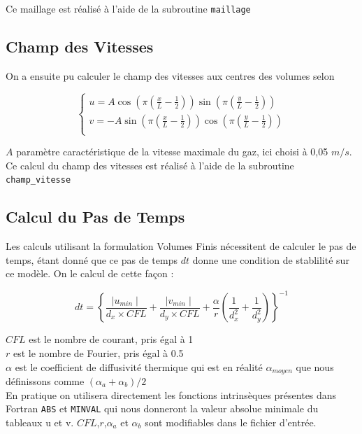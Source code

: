 \documentclass[a4paper,oneside]{article}
\begin{document}
Ce maillage est réalisé à l'aide de la subroutine \verb?maillage?

\subsection{Champ des Vitesses}

On a ensuite pu calculer le champ des vitesses aux centres des volumes selon \label{eqvitesses}

\begin{equation*}
\begin{cases}
 u = A \cos \left( \pi \left( {\frac{x}{L} - \frac{1}{2}} \right) \right)  \sin \left( \pi \left( \frac{y}{L} - \frac{1}{2}\right) \right) \\
 v = -A \sin \left( \pi \left( {\frac{x}{L} - \frac{1}{2}} \right) \right)  \cos \left( \pi \left( \frac{y}{L} - \frac{1}{2}\right) \right) \\
\end{cases}

\end{equation*}

 $A$ paramètre caractéristique de la vitesse maximale du gaz, ici choisi à 0,05 $m/s$.\\

Ce calcul du champ des vitesses est réalisé à l'aide de la subroutine \verb?champ_vitesse?

\subsection{Calcul du Pas de Temps}

Les calculs utilisant la formulation Volumes Finis nécessitent de calculer le pas de temps, étant donné que ce pas de temps $dt$ donne une condition de stablilité sur ce modèle. On le calcul de cette façon :

\[
	dt =  \left\{ \frac{\mid u_{min}\mid}{d_x \times CFL} +\frac{\mid v_{min}\mid}{d_y \times CFL} + \frac{\alpha}{r}\left(\frac{1}{d_x^2} + \frac{1}{d_y^2}\right) \right\}^{-1}
\]

\noindent $CFL$ est le nombre de courant, pris égal à 1\\
$r$ est le nombre de Fourier, pris égal à 0.5\\
$\alpha$ est le coefficient de diffusivité thermique qui est en réalité $\alpha_{moyen}$ que nous définissons comme $(\alpha_a + \alpha_b)/2$\\

En pratique on utilisera directement les fonctions intrinsèques présentes dans Fortran \verb?ABS? et \verb?MINVAL? qui nous donneront la valeur absolue minimale du tableaux u et v.
$CFL$,$r$,$\alpha_a$ et $\alpha_b$ sont modifiables dans le fichier d'entrée.
\end{document}
